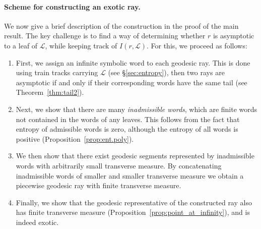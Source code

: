 \documentclass[11pt]{article} %
\theoremstyle{plain}
\theoremstyle{definition}
\numberwithin{equation}{section}
\begin{document}
\paragraph{Scheme for constructing an exotic ray.}
We now give a brief description of the construction in the proof of the main result. The key challenge is to find a way of determining whether $r$ is asymptotic to a leaf of $\mathcal{L}$, while keeping track of $I(r,\mathcal{L})$. For this, we proceed as follows:
\begin{enumerate}[topsep=0mm, itemsep=0mm]
    \item First, we assign an infinite symbolic word to each geodesic ray. This is done using train tracks carrying $\mathcal{L}$ (see \S\ref{sec:entropy}), then two rays are asymptotic if and only if their corresponding words have the same tail (see Theorem~\ref{thm:tail2}).
    \item Next, we show that there are many \emph{inadmissible words}, which are finite words not contained in the words of any leaves. This follows from the fact that entropy of admissible words is zero, although the entropy of all words is positive (Proposition~\ref{prop:ent.poly}). 
    
    \item We then show that there exist geodesic segments represented by inadmissible words with arbitrarily small transverse measure. By concatenating inadmissible words of smaller and smaller transverse measure we obtain a piecewise geodesic ray with finite transverse measure.
    \item Finally, we show that the geodesic representative of the constructed ray also has finite transverse measure (Proposition~\ref{prop:point_at_infinity}), and is indeed exotic. 
\end{enumerate}
\end{document}
